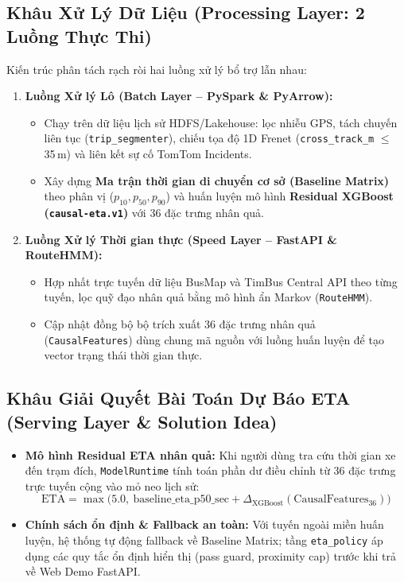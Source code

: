 \documentclass[11pt,a4paper]{article}
\begin{document}
\subsection{Khâu Xử Lý Dữ Liệu (Processing Layer: 2 Luồng Thực Thi)}
Kiến trúc phân tách rạch ròi hai luồng xử lý bổ trợ lẫn nhau:
\begin{enumerate}[leftmargin=*,noitemsep,topsep=1.5pt]
    \item \textbf{Luồng Xử lý Lô (Batch Layer -- PySpark \& PyArrow):}
    \begin{itemize}[leftmargin=*,noitemsep]
        \item Chạy trên dữ liệu lịch sử HDFS/Lakehouse: lọc nhiễu GPS, tách chuyến liên tục (\texttt{trip\_segmenter}), chiếu tọa độ 1D Frenet (\texttt{cross\_track\_m} $\le$ 35\,m) và liên kết sự cố TomTom Incidents.
        \item Xây dựng \textbf{Ma trận thời gian di chuyển cơ sở (Baseline Matrix)} theo phân vị ($p_{10}, p_{50}, p_{90}$) và huấn luyện mô hình \textbf{Residual XGBoost (\texttt{causal-eta.v1})} với 36 đặc trưng nhân quả.
    \end{itemize}
    \item \textbf{Luồng Xử lý Thời gian thực (Speed Layer -- FastAPI \& RouteHMM):}
    \begin{itemize}[leftmargin=*,noitemsep]
        \item Hợp nhất trực tuyến dữ liệu BusMap và TimBus Central API theo từng tuyến, lọc quỹ đạo nhân quả bằng mô hình ẩn Markov (\texttt{RouteHMM}).
        \item Cập nhật đồng bộ bộ trích xuất 36 đặc trưng nhân quả (\texttt{CausalFeatures}) dùng chung mã nguồn với luồng huấn luyện để tạo vector trạng thái thời gian thực.
    \end{itemize}
\end{enumerate}

\subsection{Khâu Giải Quyết Bài Toán Dự Báo ETA (Serving Layer \& Solution Idea)}
\begin{itemize}[leftmargin=*,noitemsep,topsep=1.5pt]
    \item \textbf{Mô hình Residual ETA nhân quả:} Khi người dùng tra cứu thời gian xe đến trạm đích, \texttt{ModelRuntime} tính toán phần dư điều chỉnh từ 36 đặc trưng trực tuyến cộng vào mỏ neo lịch sử:
    \begin{equation}
        \text{ETA} = \max\bigl(5.0,\ \text{baseline\_eta\_p50\_sec} + \Delta_{\text{XGBoost}}(\text{CausalFeatures}_{36})\bigr)
    \end{equation}
    \item \textbf{Chính sách ổn định \& Fallback an toàn:} Với tuyến ngoài miền huấn luyện, hệ thống tự động fallback về Baseline Matrix; tầng \texttt{eta\_policy} áp dụng các quy tắc ổn định hiển thị (pass guard, proximity cap) trước khi trả về Web Demo FastAPI.
\end{itemize}
\end{document}
